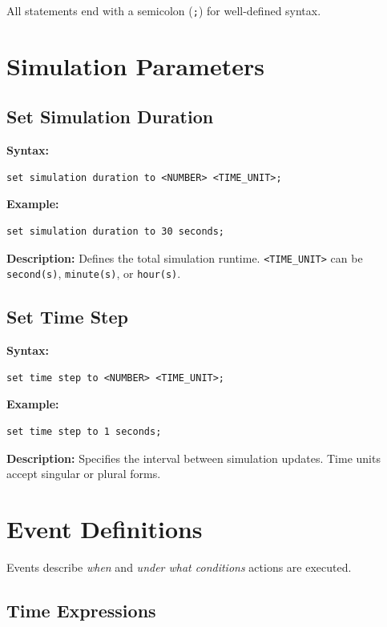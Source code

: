 \documentclass[12pt]{article}
\begin{document}
All statements end with a semicolon (\texttt{;}) for well-defined syntax.

\section{Simulation Parameters}

\subsection{Set Simulation Duration}

\textbf{Syntax:}
\begin{lstlisting}
set simulation duration to <NUMBER> <TIME_UNIT>;
\end{lstlisting}

\textbf{Example:}
\begin{lstlisting}
set simulation duration to 30 seconds;
\end{lstlisting}

\textbf{Description:} Defines the total simulation runtime. \texttt{<TIME\_UNIT>} can be \texttt{second(s)},
\texttt{minute(s)}, or \texttt{hour(s)}.

\subsection{Set Time Step}

\textbf{Syntax:}
\begin{lstlisting}
set time step to <NUMBER> <TIME_UNIT>;
\end{lstlisting}

\textbf{Example:}
\begin{lstlisting}
set time step to 1 seconds;
\end{lstlisting}

\textbf{Description:} Specifies the interval between simulation updates. Time units accept singular or plural
forms.

\section{Event Definitions}

Events describe \textit{when} and \textit{under what conditions} actions are executed.

\subsection{Time Expressions}
\end{document}
